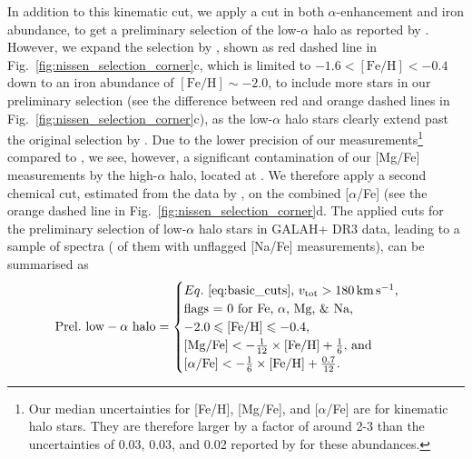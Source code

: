 \documentclass[fleqn,usenatbib]{mnras}
\begin{document}
In addition to this kinematic cut, we apply a cut in both $\alpha$-enhancement and iron abundance, to get a preliminary selection of the low-$\alpha$ halo as reported by \citet{Nissen2010}. However, we expand the selection by \citet{Nissen2010}, shown as red dashed line in Fig.~\ref{fig:nissen_selection_corner}c, which is limited to $-1.6 < \mathrm{[Fe/H]} < -0.4$ down to an iron abundance of $\mathrm{[Fe/H]} \sim -2.0$, to include more stars in our preliminary selection (see the difference between red and orange dashed lines in Fig.~\ref{fig:nissen_selection_corner}c), as the low-$\alpha$ halo stars clearly extend past the original selection by \citet{Nissen2010}. Due to the lower precision of our measurements\footnote{Our median uncertainties for [Fe/H], [Mg/Fe], and [$\alpha$/Fe] are \protect for kinematic halo stars. They are therefore larger by a factor of around 2-3 than the uncertainties of 0.03, 0.03, and 0.02 reported by \citet{Nissen2010} for these abundances.} compared to \citet{Nissen2010}, we see, however, a significant contamination of our [Mg/Fe] measurements by the high-$\alpha$ halo, located at . We therefore apply a second chemical cut, estimated from the data by \citet{Nissen2010}, on the combined [$\alpha$/Fe] (see the orange dashed line in Fig.~\ref{fig:nissen_selection_corner}d. The applied cuts for the preliminary selection of low-$\alpha$ halo stars in GALAH+ DR3 data, leading to a sample of  spectra ( of them with unflagged [Na/Fe] measurements), can be summarised as
\begin{equation} \label{eq:prelim_low_alpha_halo}
\mathrm{Prel.~low-\alpha~halo} =
\begin{cases}
Eq.~\ref{eq:basic_cuts}\text{, }v_\text{tot} > 180\,\mathrm{km\,s^{-1}} \text{, } \\
\text{flags = 0 for Fe, }\alpha\text{, Mg, \& Na, } \\
-2.0 \leq \mathrm{[Fe/H]} \leq -0.4 \text{, }\\
\mathrm{[Mg/Fe]} < - \frac{1}{12} \times \mathrm{[Fe/H]} + \frac{1}{6} \text{, and}\\
\mathrm{[\alpha/Fe]} < - \frac{1}{6} \times \mathrm{[Fe/H]} + \frac{0.7}{12}.\\
\end{cases}
\end{equation}
\end{document}
